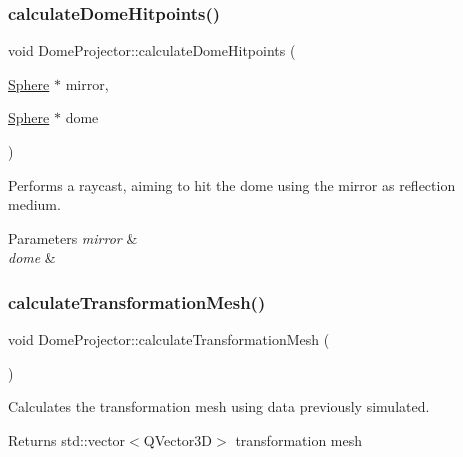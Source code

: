 \subsubsection{\texorpdfstring{calculate\+Dome\+Hitpoints()}{calculateDomeHitpoints()}}
{\footnotesize\ttfamily void Dome\+Projector\+::calculate\+Dome\+Hitpoints (\begin{DoxyParamCaption}\item[{\mbox{\hyperlink{class_sphere}{Sphere}} $\ast$}]{mirror,  }\item[{\mbox{\hyperlink{class_sphere}{Sphere}} $\ast$}]{dome }\end{DoxyParamCaption})}



Performs a raycast, aiming to hit the dome using the mirror as reflection medium. 


\begin{DoxyParams}{Parameters}
{\em mirror} & \\
\hline
{\em dome} & \\
\hline
\end{DoxyParams}
\mbox{\label{class_dome_projector_a28963378c069176dc852605e02a12ed4}} 
\subsubsection{\texorpdfstring{calculate\+Transformation\+Mesh()}{calculateTransformationMesh()}}
{\footnotesize\ttfamily void Dome\+Projector\+::calculate\+Transformation\+Mesh (\begin{DoxyParamCaption}{ }\end{DoxyParamCaption})}



Calculates the transformation mesh using data previously simulated. 

\begin{DoxyReturn}{Returns}
std\+::vector$<$\+Q\+Vector3\+D$>$ transformation mesh 
\end{DoxyReturn}
\mbox{\label{class_dome_projector_a6d7a65d45ce490b25d79694ec2b76f3b}} 
